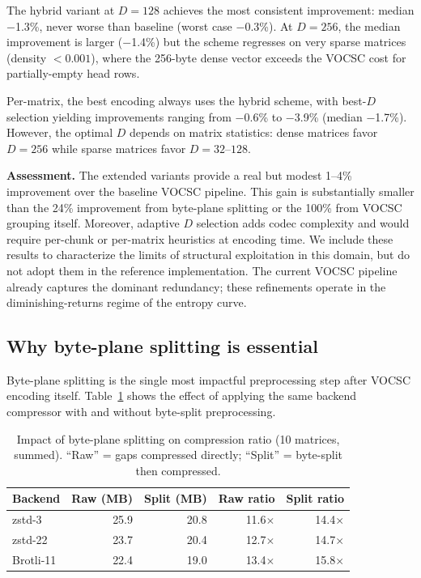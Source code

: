 \documentclass[10pt,twocolumn,letterpaper]{article}
\begin{document}
The hybrid variant at $D = 128$ achieves the most consistent improvement: median $-$1.3\%, never worse than baseline (worst case $-$0.3\%).
At $D = 256$, the median improvement is larger ($-$1.4\%) but the scheme regresses on very sparse matrices (density $< 0.001$), where the 256-byte dense vector exceeds the VOCSC cost for partially-empty head rows.

Per-matrix, the best encoding always uses the hybrid scheme, with best-$D$ selection yielding improvements ranging from $-$0.6\% to $-$3.9\% (median $-$1.7\%).
However, the optimal $D$ depends on matrix statistics: dense matrices favor $D = 256$ while sparse matrices favor $D = 32$--$128$.

\textbf{Assessment.}
The extended variants provide a real but modest 1--4\% improvement over the baseline VOCSC pipeline.
This gain is substantially smaller than the 24\% improvement from byte-plane splitting or the 100\% from VOCSC grouping itself.
Moreover, adaptive $D$ selection adds codec complexity and would require per-chunk or per-matrix heuristics at encoding time.
We include these results to characterize the limits of structural exploitation in this domain, but do not adopt them in the reference implementation.
The current VOCSC pipeline already captures the dominant redundancy; these refinements operate in the diminishing-returns regime of the entropy curve.

\subsection{Why byte-plane splitting is essential}

Byte-plane splitting is the single most impactful preprocessing step after VOCSC encoding itself.
Table~\ref{tab:bsplit} shows the effect of applying the same backend compressor with and without byte-split preprocessing.

\begin{table}[t]
\centering
\caption{Impact of byte-plane splitting on compression ratio (10 matrices, summed). ``Raw'' = gaps compressed directly; ``Split'' = byte-split then compressed.}
\label{tab:bsplit}
\footnotesize
\begin{tabular}{lrrrr}
\toprule
Backend & Raw (MB) & Split (MB) & Raw ratio & Split ratio \\
\midrule
zstd-3   & 25.9 & 20.8 & 11.6$\times$ & 14.4$\times$ \\
zstd-22  & 23.7 & 20.4 & 12.7$\times$ & 14.7$\times$ \\
Brotli-11& 22.4 & 19.0 & 13.4$\times$ & 15.8$\times$ \\
\bottomrule
\end{tabular}
\end{table}
\end{document}
